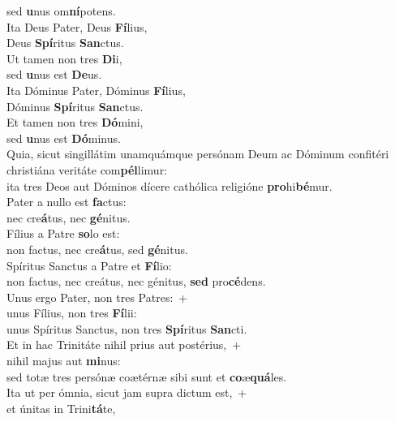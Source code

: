 \evenverse sed \textbf{u}nus om\textbf{ní}potens.\\
\oddverse Ita Deus Pater, Deus \textbf{Fí}lius,~\*\\
\oddverse Deus \textbf{Spí}ritus \textbf{San}ctus.\\
\evenverse Ut tamen non tres \textbf{Di}i,~\*\\
\evenverse sed \textbf{u}nus est \textbf{De}us.\\
\oddverse Ita Dóminus Pater, Dóminus \textbf{Fí}lius,~\*\\
\oddverse Dóminus \textbf{Spí}ritus \textbf{San}ctus.\\
\evenverse Et tamen non tres \textbf{Dó}mini,~\*\\
\evenverse sed \textbf{u}nus est \textbf{Dó}minus.\\
\oddverse Quia, sicut singillátim unamquámque persónam Deum ac Dóminum confitéri christiána veritáte com\textbf{pél}limur:~\*\\
\oddverse ita tres Deos aut Dóminos dícere cathólica religióne \textbf{pro}hi\textbf{bé}mur.\\
\evenverse Pater a nullo est \textbf{fa}ctus:~\*\\
\evenverse nec cre\textbf{á}tus, nec \textbf{gé}nitus.\\
\oddverse Fílius a Patre \textbf{so}lo est:~\*\\
\oddverse non factus, nec cre\textbf{á}tus, sed \textbf{gé}nitus.\\
\evenverse Spíritus Sanctus a Patre et \textbf{Fí}lio:~\*\\
\evenverse non factus, nec creátus, nec génitus, \textbf{sed} pro\textbf{cé}dens.\\
\oddverse Unus ergo Pater, non tres Patres:~+\\
\oddverse  unus Fílius, non tres \textbf{Fí}lii:~\*\\
\oddverse unus Spíritus Sanctus, non tres \textbf{Spí}ritus \textbf{San}cti.\\
\evenverse Et in hac Trinitáte nihil prius aut postérius,~+\\
\evenverse  nihil majus aut \textbf{mi}nus:~\*\\
\evenverse sed totæ tres persónæ coætérnæ sibi sunt et \textbf{co}æ\textbf{quá}les.\\
\oddverse Ita ut per ómnia, sicut jam supra dictum est,~+\\
\oddverse  et únitas in Trini\textbf{tá}te,~\*\\
